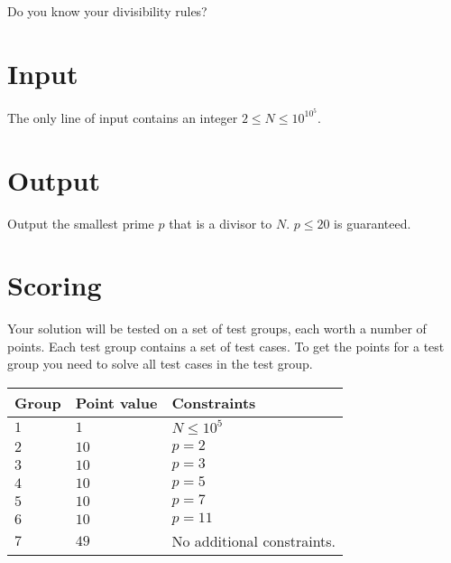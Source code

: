 \noindent
Do you know your divisibility rules?


\section*{Input}
\noindent
The only line of input contains an integer $2 \leq N \leq 10^{10^5}$. 

\section*{Output}
\noindent
Output the smallest prime $p$ that is a divisor to $N$. $p \leq 20$ is guaranteed.


\section*{Scoring}
Your solution will be tested on a set of test groups, each worth a number of points. 
Each test group contains a set of test cases. 
To get the points for a test group you need to solve all test cases in the test group.

\noindent
\begin{tabular}{| l | l | p{12cm} |}
  \hline
  \textbf{Group} & \textbf{Point value} & \textbf{Constraints} \\ \hline
  $1$    & $1$          & $N \leq 10^5$  \\ \hline
  $2$    & $10$         & $p = 2$  \\ \hline
  $3$    & $10$         & $p = 3$  \\ \hline
  $4$    & $10$         & $p = 5$  \\ \hline
  $5$    & $10$         & $p = 7$  \\ \hline
  $6$    & $10$         & $p = 11$  \\ \hline
  $7$    & $49$         & No additional constraints. \\ \hline
\end{tabular}


